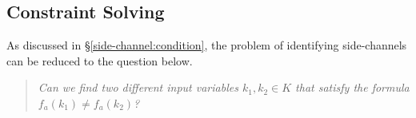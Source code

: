 \begin{table}%
      \centering%
      \caption{The number of x86 instructions and the number
      of REIL and VEX IR instructions on each trace of crypto programs.}
      \label{scala:ir}
      \end{table}

\subsection{Constraint Solving}
As discussed in \S\ref{side-channel:condition}, the problem
of identifying side-channels can be reduced to the  
question below.

\begin{quote}
\textit{Can we find two different input variables $k_1, k_2 \in K$ that satisfy the
        formula $f_a(k_1) \neq f_a(k_2)$?}
\end{quote}

